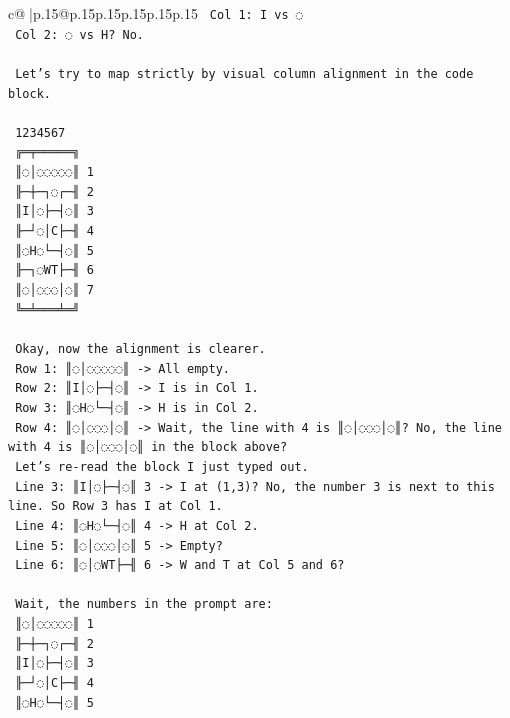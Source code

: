 \documentclass{article}
\begin{document}
{\begin{supertabular}{c@{$\;$}|p{.15\linewidth}@{}p{.15\linewidth}p{.15\linewidth}p{.15\linewidth}p{.15\linewidth}p{.15\linewidth}}
{{{\texttt{   Col 1: I vs ◌} \\
\texttt{   Col 2: ◌ vs H? No.} \\
\\ 
\texttt{   Let's try to map strictly by visual column alignment in the code block.} \\
\\ 
\texttt{    1234567} \\
\texttt{   ╔═╤═════╗} \\
\texttt{   ║◌│◌◌◌◌◌║ 1} \\
\texttt{   ╟─┼─┐◌┌─╢ 2} \\
\texttt{   ║I│◌├─┤◌║ 3} \\
\texttt{   ╟─┘◌│C├─╢ 4} \\
\texttt{   ║◌H◌└─┤◌║ 5} \\
\texttt{   ╟─┐◌WT├─╢ 6} \\
\texttt{   ║◌│◌◌◌│◌║ 7} \\
\texttt{   ╚═╧═══╧═╝} \\
\\ 
\texttt{   Okay, now the alignment is clearer.} \\
\texttt{   Row 1: ║◌│◌◌◌◌◌║ {-}> All empty.} \\
\texttt{   Row 2: ║I│◌├─┤◌║ {-}> I is in Col 1.} \\
\texttt{   Row 3: ║◌H◌└─┤◌║ {-}> H is in Col 2.} \\
\texttt{   Row 4: ║◌│◌◌◌│◌║ {-}> Wait, the line with 4 is ║◌│◌◌◌│◌║? No, the line with 4 is ║◌│◌◌◌│◌║ in the block above?} \\
\texttt{   Let's re{-}read the block I just typed out.} \\
\texttt{   Line 3: ║I│◌├─┤◌║ 3 {-}> I at (1,3)? No, the number 3 is next to this line. So Row 3 has I at Col 1.} \\
\texttt{   Line 4: ║◌H◌└─┤◌║ 4 {-}> H at Col 2.} \\
\texttt{   Line 5: ║◌│◌◌◌│◌║ 5 {-}> Empty?} \\
\texttt{   Line 6: ║◌│◌WT├─╢ 6 {-}> W and T at Col 5 and 6?} \\
\\ 
\texttt{   Wait, the numbers in the prompt are:} \\
\texttt{   ║◌│◌◌◌◌◌║ 1} \\
\texttt{   ╟─┼─┐◌┌─╢ 2} \\
\texttt{   ║I│◌├─┤◌║ 3} \\
\texttt{   ╟─┘◌│C├─╢ 4} \\
\texttt{   ║◌H◌└─┤◌║ 5} \\
}}}
\end{supertabular}}
\end{document}

